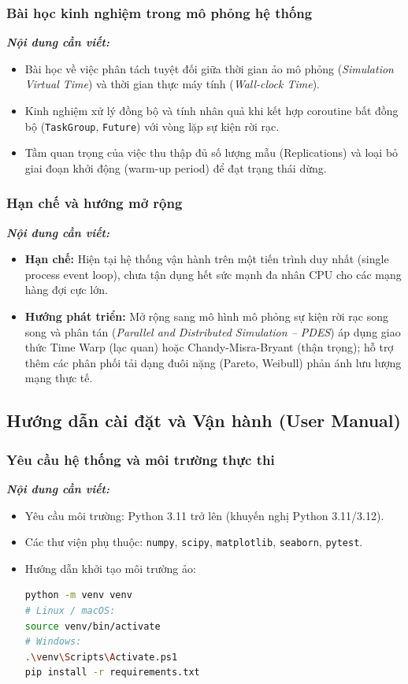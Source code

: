 \subsubsection{Bài học kinh nghiệm trong mô phỏng hệ thống}
\textit{\textbf{Nội dung cần viết:}}
\begin{itemize}[leftmargin=1.5em]
    \item Bài học về việc phân tách tuyệt đối giữa thời gian ảo mô phỏng (\textit{Simulation Virtual Time}) và thời gian thực máy tính (\textit{Wall-clock Time}).
    \item Kinh nghiệm xử lý đồng bộ và tính nhân quả khi kết hợp coroutine bất đồng bộ (\texttt{TaskGroup}, \texttt{Future}) với vòng lặp sự kiện rời rạc.
    \item Tầm quan trọng của việc thu thập đủ số lượng mẫu (Replications) và loại bỏ giai đoạn khởi động (warm-up period) để đạt trạng thái dừng.
\end{itemize}

\subsubsection{Hạn chế và hướng mở rộng}
\textit{\textbf{Nội dung cần viết:}}
\begin{itemize}[leftmargin=1.5em]
    \item \textbf{Hạn chế:} Hiện tại hệ thống vận hành trên một tiến trình duy nhất (single process event loop), chưa tận dụng hết sức mạnh đa nhân CPU cho các mạng hàng đợi cực lớn.
    \item \textbf{Hướng phát triển:} Mở rộng sang mô hình mô phỏng sự kiện rời rạc song song và phân tán (\textit{Parallel and Distributed Simulation -- PDES}) áp dụng giao thức Time Warp (lạc quan) hoặc Chandy-Misra-Bryant (thận trọng); hỗ trợ thêm các phân phối tải dạng đuôi nặng (Pareto, Weibull) phản ánh lưu lượng mạng thực tế.
\end{itemize}

\subsection{Hướng dẫn cài đặt và Vận hành (User Manual)}
\label{subsec:user-manual}

\subsubsection{Yêu cầu hệ thống và môi trường thực thi}
\textit{\textbf{Nội dung cần viết:}}
\begin{itemize}[leftmargin=1.5em]
    \item Yêu cầu môi trường: Python 3.11 trở lên (khuyến nghị Python 3.11/3.12).
    \item Các thư viện phụ thuộc: \texttt{numpy}, \texttt{scipy}, \texttt{matplotlib}, \texttt{seaborn}, \texttt{pytest}.
    \item Hướng dẫn khởi tạo môi trường ảo:
    \begin{lstlisting}[language=bash]
python -m venv venv
# Linux / macOS:
source venv/bin/activate
# Windows:
.\venv\Scripts\Activate.ps1
pip install -r requirements.txt
    \end{lstlisting}
\end{itemize}

